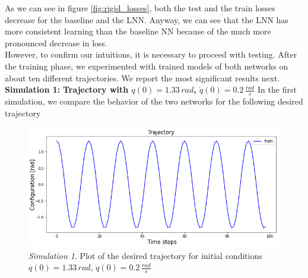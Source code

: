 \documentclass[a4paper]{article}
\begin{document}
As we can see in figure \ref{fig:rigid_losses}, both the test and the train losses decrease for the baseline and the LNN. Anyway, we can see that the LNN has more consistent learning than the baseline NN because of the much more pronounced decrease in loss.\\ However, to confirm our intuitions, it is necessary to proceed with testing. After the training phase, we experimented with trained models of both networks on about ten different trajectories. We report the most significant results next.\\

\textbf{Simulation 1:} \textbf{Trajectory with $q(0)=1.33\, rad$, $\dot{q}(0)=0.2\, \frac{rad}{s}$}
In the first simulation, we compare the behavior of the two networks for the following desired trajectory

\begin{figure}
    \centering
    \includegraphics[scale=0.7]{img/final_results/rigid/76deg_02rads/traj_76_02.png}
    \caption{\textit{Simulation 1}. Plot of the desired trajectory for initial conditions $q(0)=1.33\, rad$, $\dot{q}(0)=0.2\, \frac{rad}{s}$}
    \label{fig:desired_rigid_76degrees_02rads}
\end{figure}
\end{document}
